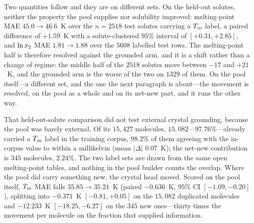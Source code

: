 Two quantities follow and they are on different sets. On the held-out solutes, neither the property
the pool supplies nor solubility improved: melting-point MAE $45.0\to46.6$~K over the $n=2518$ test
solutes carrying a $T_m$ label, a paired difference of $+1.59$~K with a solute-clustered $95\%$
interval of $[+0.31,+2.85]$, and $\ln x_2$ MAE $1.81\to1.88$ over the $5608$ labelled test rows. The
melting-point half is therefore resolved against the grounded arm, and it is a shift rather than a
change of regime: the middle half of the $2518$ solutes move between $-17$ and $+21$~K, and the
grounded arm is the worse of the two on $1329$ of them. On
the pool itself---a different set, and the one the next paragraph is about---the movement is
resolved, on the pool as a whole and on its net-new part, and it runs the other way.

That held-out-solute comparison did not test external crystal grounding, because the pool was barely external. Of its $15{,}427$ molecules, $15{,}082$---$97.76\%$---already carried a $T_m$ label in the training corpus, $98.2\%$ of them agreeing with the in-corpus value to within a millikelvin (mean $|\Delta|$ $0.07$~K); the net-new contribution is $345$ molecules, $2.24\%$. The two label sets are drawn from the same open melting-point tables, and nothing in the pool builder counts the overlap. Where the pool did carry something new, the crystal head moved. Scored on the pool itself, $T_m$ MAE falls $35.85\to35.21$~K (paired $-0.636$~K, $95\%$ CI $[-1.09,-0.20]$), splitting into $-0.371$~K $[-0.81,+0.05]$ on the $15{,}082$ duplicated molecules and $-12.233$~K $[-18.25,-6.27]$ on the $345$ new ones---thirty times the movement per molecule on the fraction that supplied information.

